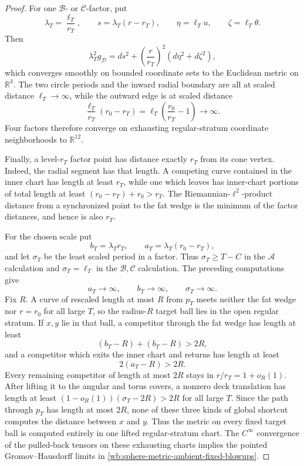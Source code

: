 \begin{proof}
For one \(\mathcal B\)- or \(\mathcal C\)-factor, put
\[
 \lambda_T=\frac{\ell_T}{r_T},\qquad
 s=\lambda_T(r-r_T),\qquad
 \eta=\ell_Tu,\qquad \zeta=\ell_T\theta.
\]
Then
\[
 \lambda_T^2g_{\mathcal D}
 =ds^2+\left(\frac r{r_T}\right)^2
       (d\eta^2+d\zeta^2),
\]
which converges smoothly on bounded coordinate sets to the Euclidean metric
on \(\mathbb R^3\).  The two circle periods and the inward radial boundary
are all at scaled distance \(\ell_T\to\infty\), while the outward edge is
at scaled distance
\[
 \frac{\ell_T}{r_T}(r_0-r_T)
 =\ell_T\left(\frac{r_0}{r_T}-1\right)\longrightarrow\infty.
\]
Four factors therefore converge on exhausting regular-stratum coordinate
neighborhoods to \(\mathbb R^{12}\).

Finally, a level-\(r_T\) factor point has distance exactly \(r_T\) from its
cone vertex.  Indeed, the radial segment has that length.  A competing
curve contained in the inner chart has length at least \(r_T\), while one
which leaves has inner-chart portions of total length at least
\((r_0-r_T)+r_0>r_T\).  The Riemannian-\(\ell^2\)-product distance from a
synchronized point to the fat wedge is the minimum of the factor
distances, and hence is also \(r_T\).

For the chosen scale put
\[
 b_T=\lambda_Tr_T,\qquad a_T=\lambda_T(r_0-r_T),
\]
and let \(\sigma_T\) be the least scaled period in a factor.  Thus
\(\sigma_T\geq T-C\) in the \(\mathcal A\) calculation and
\(\sigma_T=\ell_T\) in the \(\mathcal B,\mathcal C\) calculation.  The
preceding computations give
\[
 a_T\longrightarrow\infty,\qquad
 b_T\longrightarrow\infty,\qquad
 \sigma_T\longrightarrow\infty.
\]
Fix \(R\).  A curve of rescaled length at most \(R\) from \(p_T\) meets
neither the fat wedge nor \(r=r_0\) for all large \(T\), so the
radius-\(R\) target ball lies in the open regular stratum.  If \(x,y\) lie
in that ball, a competitor through the fat wedge has length at least
\[
 (b_T-R)+(b_T-R)>2R,
\]
and a competitor which exits the inner chart and returns has length at
least
\[
 2(a_T-R)>2R.
\]
Every remaining competitor of length at most \(2R\) stays in
\(r/r_T=1+o_R(1)\).  After lifting it to the angular and torus covers, a
nonzero deck translation has length at least
\((1-o_R(1))(\sigma_T-2R)>2R\) for all large \(T\).  Since the path through
\(p_T\) has length at most \(2R\), none of these three kinds of global
shortcut computes the distance between \(x\) and \(y\).  Thus the metric
on every fixed target ball is computed entirely in one lifted
regular-stratum chart.  The \(C^\infty\) convergence of the pulled-back
tensors on these exhausting charts implies the pointed
Gromov--Hausdorff limits in
\eqref{wb:sphere-metric-ambient-fixed-blowups}.
\end{proof}

